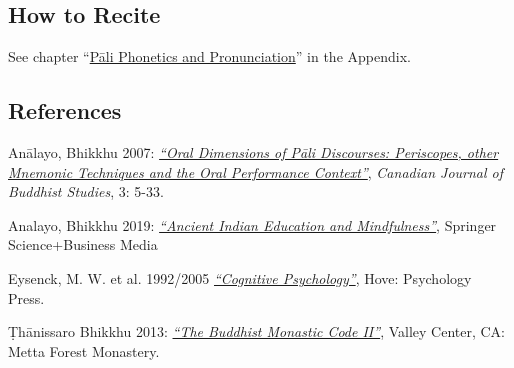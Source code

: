 \subsection*{How to Recite}

See chapter ``\hyperref[phonetics]{Pāli Phonetics and Pronunciation}'' in the Appendix.

\subsection*{References}

Anālayo, Bhikkhu 2007: \href{https://www.buddhismuskunde.uni-hamburg.de/pdf/5-personen/analayo/oral-dimensions.pdf}{\textit{``Oral Dimensions of Pāli Discourses: Periscopes, other Mnemonic Techniques and the Oral Performance Context''}}, \textit{Canadian Journal of Buddhist Studies}, 3: 5-33.

Analayo, Bhikkhu 2019: \href{https://www.buddhismuskunde.uni-hamburg.de/pdf/5-personen/analayo/ancientindianeducation.pdf}{\textit{``Ancient Indian Education and Mindfulness''}}, Springer Science+Business Media

Eysenck, M. W. et al. 1992/2005 \href{https://psycnet.apa.org/record/2015-09422-000}{\textit{``Cognitive Psychology''}}, Hove: Psychology Press.

Ṭhānissaro Bhikkhu 2013:  \href{https://www.dhammatalks.org/Archive/Writings/Ebooks/BMC1&2_200826.pdf}{\textit{``The Buddhist Monastic Code II''}}, Valley Center, CA: Metta Forest Monastery.

